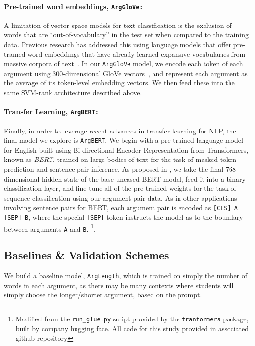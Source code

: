 \documentclass[runningheads]{llncs}
\begin{document}
\paragraph{\textbf{Pre-trained word embeddings, \tt{ArgGloVe}:}}
A limitation of vector space models for text classification is the exclusion of 
words that are ``out-of-vocabulary'' in the test set when compared to the 
training data.
Previous research has addressed this using language models that 
offer pre-trained word-embeddings that have already learned expansive 
vocabularies from massive corpora of 
text~\cite{habernal_which_2016}\cite{gleize_are_2019}.    
In our \verb|ArgGloVe| model, we encode each token of each argument using 
300-dimensional GloVe vectors~\cite{pennington_glove:_2014}, 
and represent each argument as the average of its token-level embedding 
vectors. 
We then feed these into the same SVM-rank architecture described above. 

\paragraph{\textbf{Transfer Learning, \tt{ArgBERT}:}}
Finally, in order to leverage recent advances in transfer-learning for NLP, the 
final model we explore is \verb|ArgBERT|.
We begin with a pre-trained language model for English built using  
Bi-directional Encoder Representation from Transformers, known as 
\textit{BERT}\cite{devlin_bert_2018}, trained on large bodies of text for the 
task of masked token prediction and sentence-pair inference. 
As proposed in \cite{toledo_automatic_2019}, we take the final 768-dimensional 
hidden state of the base-uncased BERT model, feed it into a binary 
classification layer, and fine-tune all of the pre-trained weights for the task 
of sequence classification using our argument-pair data. 
As in other applications involving sentence pairs for BERT, each argument pair 
is encoded as \verb|[CLS] A [SEP] B|, where the special \verb|[SEP]| token 
instructs the model as to the boundary between arguments \verb|A| and \verb|B|. 
\footnote{Modified from the \verb|run_glue.py| 
script provided by the \verb|tranformers| package, built by company hugging 
face. All code for this study provided in associated github repository}.

\subsection{Baselines \& Validation Schemes}

We build a baseline model, \verb|ArgLength|, which is trained 
on simply the number of words in each argument, as there may be many contexts 
where students will simply choose the longer/shorter argument, based on the 
prompt. 
\end{document}
